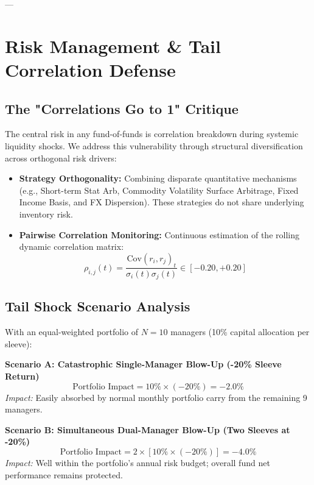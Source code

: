 \documentclass[11pt,a4paper]{article}
\begin{document}
---

\section{Risk Management \& Tail Correlation Defense}

\subsection{The "Correlations Go to 1" Critique}
The central risk in any fund-of-funds is correlation breakdown during systemic liquidity shocks. We address this vulnerability through structural diversification across orthogonal risk drivers:

\begin{itemize}[leftmargin=1.5em, itemsep=0.3em]
    \item \textbf{Strategy Orthogonality:} Combining disparate quantitative mechanisms (e.g., Short-term Stat Arb, Commodity Volatility Surface Arbitrage, Fixed Income Basis, and FX Dispersion). These strategies do not share underlying inventory risk.
    \item \textbf{Pairwise Correlation Monitoring:} Continuous estimation of the rolling dynamic correlation matrix:
    \begin{equation}
    \rho_{i,j}(t) = \frac{\text{Cov}(r_i, r_j)_t}{\sigma_i(t)\sigma_j(t)} \in [-0.20, +0.20]
    \end{equation}
\end{itemize}

\subsection{Tail Shock Scenario Analysis}
With an equal-weighted portfolio of $N = 10$ managers (10\% capital allocation per sleeve):

\begin{statbox}
\textbf{Scenario A: Catastrophic Single-Manager Blow-Up (-20\% Sleeve Return)}
$$\text{Portfolio Impact} = 10\% \times (-20\%) = -2.0\%$$
\textit{Impact:} Easily absorbed by normal monthly portfolio carry from the remaining 9 managers.

\vspace{0.4cm}
\textbf{Scenario B: Simultaneous Dual-Manager Blow-Up (Two Sleeves at -20\%)}
$$\text{Portfolio Impact} = 2 \times [10\% \times (-20\%)] = -4.0\%$$
\textit{Impact:} Well within the portfolio's annual risk budget; overall fund net performance remains protected.
\end{statbox}
\end{document}
